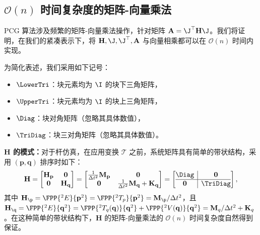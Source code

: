  \subsection{$\mathcal{O}(n)$ 时间复杂度的矩阵-向量乘法}
\label{ssec:jacobian-patt}

PCG 算法涉及频繁的矩阵-向量乘法操作，针对矩阵 $\mathbf{A} = \J^\top\mathbf{H}\J$。我们将证明，在我们的紧凑表示下，将 $\mathbf{H}, \J, \J^\top, \mathbf{A}$ 与向量相乘都可以在 $\mathcal{O}(n)$ 时间内实现。

为简化表述，我们采用如下记号：
\begin{itemize}
  \item $\LowerTri$：块元素均为 $\I$ 的块下三角矩阵，
  \item $\UpperTri$：块元素均为 $\I$ 的块上三角矩阵，
  \item $\Diag$：块对角矩阵（忽略其具体数值），
  \item $\TriDiag$：块三对角矩阵（忽略其具体数值）。
\end{itemize}

\textbf{$\mathbf H$ 的模式：}对于杆仿真，在应用变换 $\mathcal T$ 之前，系统矩阵具有简单的带状结构，采用 $(\mathbf{p}, \mathbf{q})$ 排序时如下：
\begin{equation}
  \label{eq:H-patt}
  \mathbf{H} =
  \begin{bmatrix}
    \mathbf{H}_{\mathbf{p}} & \mathbf{0}              \\
    \mathbf{0}              & \mathbf{H}_{\mathbf{q}}
  \end{bmatrix} =
  \begin{bmatrix}
    \frac{1}{\Delta t^{2}}\mathbf{M}_{\mathbf{p}} & \mathbf{0}                                                               \\
    \mathbf{0}                                    & \frac{1}{\Delta t^{2}} \mathbf{M}_{\mathbf{q}} + \mathbf{K}_{\mathbf{q}}
  \end{bmatrix} =
  \left[
    \begin{array}{@{}c|c@{}}
      \Diag      & \mathbf{0} \\
      \hline
      \mathbf{0} & \TriDiag
    \end{array}
    \right],
\end{equation}
其中 $ \mathbf{H}_{\p} = \FPP{^2E}{\mathbf{p}^2} = \FPP{^2T_{p}}{\mathbf{p}^2} =\mathbf{M}_\p/\Delta t^2$，且 $\mathbf{H}_{\q}= \FPP{^2E}{\mathbf{q}^2} = \FPP{^2T_{q}(\mathbf{q})}{\mathbf{q}^2} + \FPP{^2V(\mathbf{q})}{\mathbf{q}^2} = \mathbf{M}_q /\Delta t^2 + \mathbf{K}_q$。在这种简单的带状结构下，$\mathbf H$ 的矩阵-向量乘法的 $\mathcal{O}(n)$ 时间复杂度自然得到保证。

